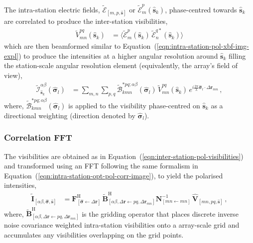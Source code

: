 \documentclass[
  journal=pasa,
  manuscript=article-type,
  year=2020,
  volume=37,
]{cup-journal}
\begin{document}
The intra-station electric fields, $\widetilde{\boldsymbol{\mathcal{E}}}_{[m,p,\hat{\boldsymbol{s}}]}$ or $\widetilde{\mathcal{E}}_m^p(\hat{\boldsymbol{s}}_k)$, phase-centred towards $\hat{\boldsymbol{s}}_k$ are correlated to produce the inter-station visibilities, 
\begin{align}
    \widetilde{V}_{mn}^{pq}(\hat{\boldsymbol{s}}_k) &= \bigl\langle \widetilde{\mathcal{E}}_m^p(\hat{\boldsymbol{s}}_k) \, \widetilde{\mathcal{E}}_n^{q*}(\hat{\boldsymbol{s}}_k)\bigr\rangle \label{eqn:inter-station-pol-visibilities}
\end{align}
which are then beamformed similar to Equation~(\ref{eqn:intra-station-pol-xbf-img-expl}) to produce the intensities at a higher angular resolution around $\hat{\boldsymbol{s}}_k$ filling the station-scale angular resolution element (equivalently, the array's field of view),
\begin{align}
    \widetilde{\mathcal{I}}^{\alpha\beta}_{\hat{\boldsymbol{s}}_k}(\hat{\boldsymbol{\sigma}}_l)
    &= \sum_{m,n} \sum_{p,q} \widetilde{\mathcal{B}}_{kmn}^{*pq;\alpha\beta}(\hat{\boldsymbol{\sigma}}_l) \, \widetilde{V}_{mn}^{pq}(\hat{\boldsymbol{s}}_k) \,  e^{i\frac{2\pi}{\lambda} \hat{\boldsymbol{\sigma}}_l\cdot\Delta\boldsymbol{r}_{m n}} \, , \label{eqn:inter-station-pol-xbf-img-expl} 
\end{align}
where, $\widetilde{\mathcal{B}}_{kmn}^{*pq;\alpha\beta}(\hat{\boldsymbol{\sigma}}_l)$ is applied to the visibility phase-centred on $\hat{\boldsymbol{s}}_k$ as a directional weighting (direction denoted by $\hat{\boldsymbol{\sigma}}_l$).  

\subsubsection{Correlation FFT}

The visibilities are obtained as in Equation~(\ref{eqn:inter-station-pol-visibilities}) and transformed using an FFT following the same formalism in Equation~(\ref{eqn:intra-station-opt-pol-corr-image}), to yield the polarised intensities,
\begin{align}
    \widetilde{\mathbf{I}}_{[\alpha\beta,\hat{\boldsymbol{\sigma}},\hat{\boldsymbol{s}}]} &= \mathbf{F}^\textrm{H}_{[\hat{\boldsymbol{\sigma}}\leftarrow\Delta\boldsymbol{r}]}\,\widetilde{\mathbf{B}}^\textrm{H}_{[\alpha\beta,\Delta\boldsymbol{r}\leftarrow pq,\Delta\boldsymbol{r}_{mn}]} \mathbf{N}^{-1}_{[mn\leftarrow mn]}\,\widehat{\mathbf{V}}_{[mn,pq,\hat{\boldsymbol{s}}]} \, , \label{eqn:inter-station-opt-pol-corr-image}
\end{align}
where, $\widetilde{\mathbf{B}}^\textrm{H}_{[\alpha\beta,\Delta\boldsymbol{r}\leftarrow pq,\Delta\boldsymbol{r}_{mn}]}$ is the gridding operator that places discrete inverse noise covariance weighted intra-station visibilities onto a array-scale grid and accumulates any visibilities overlapping on the grid points. 
\end{document}
